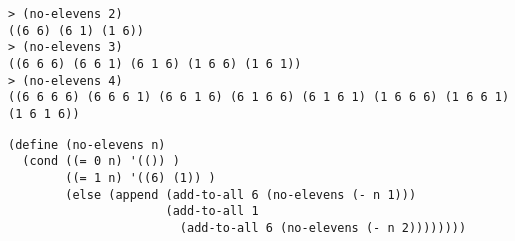 \begin{lstlisting}
> (no-elevens 2)
((6 6) (6 1) (1 6))
> (no-elevens 3)
((6 6 6) (6 6 1) (6 1 6) (1 6 6) (1 6 1))
> (no-elevens 4)
((6 6 6 6) (6 6 6 1) (6 6 1 6) (6 1 6 6) (6 1 6 1) (1 6 6 6) (1 6 6 1) (1 6 1 6))
\end{lstlisting}

\begin{solution}[0.5in]
\begin{verbatim}
(define (no-elevens n)
  (cond ((= 0 n) '(()) )
        ((= 1 n) '((6) (1)) )
        (else (append (add-to-all 6 (no-elevens (- n 1)))
                      (add-to-all 1
                        (add-to-all 6 (no-elevens (- n 2))))))))
\end{verbatim}
\end{solution}

